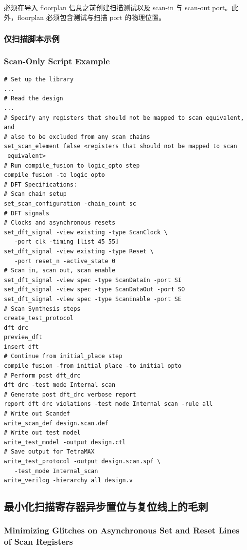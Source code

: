 \begin{noteBox}
必须在导入 floorplan 信息之前创建扫描测试以及 scan-in 与 scan-out port。此外，floorplan 必须包含测试与扫描 port 的物理位置。
\end{noteBox}

\subsubsection{仅扫描脚本示例}
\subsubsection*{Scan-Only Script Example}

\begin{lstlisting}
# Set up the library
...
# Read the design
...
# Specify any registers that should not be mapped to scan equivalent, and
# also to be excluded from any scan chains
set_scan_element false <registers that should not be mapped to scan
 equivalent>
# Run compile_fusion to logic_opto step
compile_fusion -to logic_opto
# DFT Specifications:
# Scan chain setup
set_scan_configuration -chain_count sc
# DFT signals
# Clocks and asynchronous resets
set_dft_signal -view existing -type ScanClock \
   -port clk -timing [list 45 55]
set_dft_signal -view existing -type Reset \
   -port reset_n -active_state 0
# Scan in, scan out, scan enable
set_dft_signal -view spec -type ScanDataIn -port SI
set_dft_signal -view spec -type ScanDataOut -port SO
set_dft_signal -view spec -type ScanEnable -port SE
# Scan Synthesis steps
create_test_protocol
dft_drc
preview_dft
insert_dft
# Continue from initial_place step
compile_fusion -from initial_place -to initial_opto
# Perform post dft_drc
dft_drc -test_mode Internal_scan
# Generate post dft_drc verbose report
report_dft_drc_violations -test_mode Internal_scan -rule all
# Write out Scandef
write_scan_def design.scan.def
# Write out test model
write_test_model -output design.ctl
# Save output for TetraMAX
write_test_protocol -output design.scan.spf \
   -test_mode Internal_scan
write_verilog -hierarchy all design.v
\end{lstlisting}

\subsection{最小化扫描寄存器异步置位与复位线上的毛刺}
\subsubsection*{Minimizing Glitches on Asynchronous Set and Reset Lines of Scan Registers}

